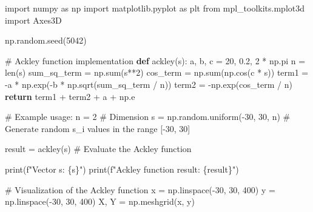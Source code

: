 \documentclass[
  letterpaper,
  DIV=11,
  numbers=noendperiod]{scrreprt}
\newenvironment{Shaded}{\begin{snugshade}}{\end{snugshade}}
\newcommand{\BuiltInTok}[1]{\textcolor[rgb]{0.00,0.23,0.31}{#1}}
\newcommand{\CommentTok}[1]{\textcolor[rgb]{0.37,0.37,0.37}{#1}}
\newcommand{\ControlFlowTok}[1]{\textcolor[rgb]{0.00,0.23,0.31}{\textbf{#1}}}
\newcommand{\DecValTok}[1]{\textcolor[rgb]{0.68,0.00,0.00}{#1}}
\newcommand{\FloatTok}[1]{\textcolor[rgb]{0.68,0.00,0.00}{#1}}
\newcommand{\ImportTok}[1]{\textcolor[rgb]{0.00,0.46,0.62}{#1}}
\newcommand{\KeywordTok}[1]{\textcolor[rgb]{0.00,0.23,0.31}{\textbf{#1}}}
\newcommand{\NormalTok}[1]{\textcolor[rgb]{0.00,0.23,0.31}{#1}}
\newcommand{\OperatorTok}[1]{\textcolor[rgb]{0.37,0.37,0.37}{#1}}
\newcommand{\SpecialCharTok}[1]{\textcolor[rgb]{0.37,0.37,0.37}{#1}}
\newcommand{\SpecialStringTok}[1]{\textcolor[rgb]{0.13,0.47,0.30}{#1}}
\begin{document}
\begin{Shaded}
\begin{Highlighting}[]
\ImportTok{import}\NormalTok{ numpy }\ImportTok{as}\NormalTok{ np}
\ImportTok{import}\NormalTok{ matplotlib.pyplot }\ImportTok{as}\NormalTok{ plt}
\ImportTok{from}\NormalTok{ mpl\_toolkits.mplot3d }\ImportTok{import}\NormalTok{ Axes3D}

\NormalTok{np.random.seed(}\DecValTok{5042}\NormalTok{)}

\CommentTok{\# Ackley function implementation}
\KeywordTok{def}\NormalTok{ ackley(s):}
\NormalTok{    a, b, c }\OperatorTok{=} \DecValTok{20}\NormalTok{, }\FloatTok{0.2}\NormalTok{, }\DecValTok{2} \OperatorTok{*}\NormalTok{ np.pi}
\NormalTok{    n }\OperatorTok{=} \BuiltInTok{len}\NormalTok{(s)}
\NormalTok{    sum\_sq\_term }\OperatorTok{=}\NormalTok{ np.}\BuiltInTok{sum}\NormalTok{(s}\OperatorTok{**}\DecValTok{2}\NormalTok{)}
\NormalTok{    cos\_term }\OperatorTok{=}\NormalTok{ np.}\BuiltInTok{sum}\NormalTok{(np.cos(c }\OperatorTok{*}\NormalTok{ s))}
\NormalTok{    term1 }\OperatorTok{=} \OperatorTok{{-}}\NormalTok{a }\OperatorTok{*}\NormalTok{ np.exp(}\OperatorTok{{-}}\NormalTok{b }\OperatorTok{*}\NormalTok{ np.sqrt(sum\_sq\_term }\OperatorTok{/}\NormalTok{ n))}
\NormalTok{    term2 }\OperatorTok{=} \OperatorTok{{-}}\NormalTok{np.exp(cos\_term }\OperatorTok{/}\NormalTok{ n)}
    \ControlFlowTok{return}\NormalTok{ term1 }\OperatorTok{+}\NormalTok{ term2 }\OperatorTok{+}\NormalTok{ a }\OperatorTok{+}\NormalTok{ np.e}

\CommentTok{\# Example usage: }
\NormalTok{n }\OperatorTok{=} \DecValTok{2}  \CommentTok{\# Dimension }
\NormalTok{s }\OperatorTok{=}\NormalTok{ np.random.uniform(}\OperatorTok{{-}}\DecValTok{30}\NormalTok{, }\DecValTok{30}\NormalTok{, n)  }\CommentTok{\# Generate random s\_i values in the range [{-}30, 30]}

\NormalTok{result }\OperatorTok{=}\NormalTok{ ackley(s)  }\CommentTok{\# Evaluate the Ackley function}

\BuiltInTok{print}\NormalTok{(}\SpecialStringTok{f"Vector s: }\SpecialCharTok{\{}\NormalTok{s}\SpecialCharTok{\}}\SpecialStringTok{"}\NormalTok{)}
\BuiltInTok{print}\NormalTok{(}\SpecialStringTok{f"Ackley function result: }\SpecialCharTok{\{}\NormalTok{result}\SpecialCharTok{\}}\SpecialStringTok{"}\NormalTok{)}

\CommentTok{\# Visualization of the Ackley function}
\NormalTok{x }\OperatorTok{=}\NormalTok{ np.linspace(}\OperatorTok{{-}}\DecValTok{30}\NormalTok{, }\DecValTok{30}\NormalTok{, }\DecValTok{400}\NormalTok{)}
\NormalTok{y }\OperatorTok{=}\NormalTok{ np.linspace(}\OperatorTok{{-}}\DecValTok{30}\NormalTok{, }\DecValTok{30}\NormalTok{, }\DecValTok{400}\NormalTok{)}
\NormalTok{X, Y }\OperatorTok{=}\NormalTok{ np.meshgrid(x, y)}


\end{Highlighting}
\end{Shaded}
\end{document}
